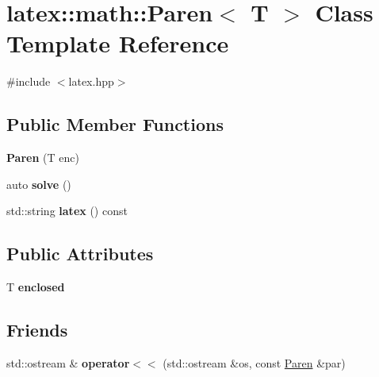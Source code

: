 \hypertarget{classlatex_1_1math_1_1Paren}{\section{latex\-:\-:math\-:\-:Paren$<$ T $>$ Class Template Reference}
\label{classlatex_1_1math_1_1Paren}
}


{\ttfamily \#include $<$latex.\-hpp$>$}

\subsection*{Public Member Functions}
\begin{DoxyCompactItemize}
\item 
\hypertarget{classlatex_1_1math_1_1Paren_a92ee4e0a519162e5c81ee889fdffb6ac}{{\bfseries Paren} (T enc)}\label{classlatex_1_1math_1_1Paren_a92ee4e0a519162e5c81ee889fdffb6ac}

\item 
\hypertarget{classlatex_1_1math_1_1Paren_aa64116c67d309121e19040fb3677da6a}{auto {\bfseries solve} ()}\label{classlatex_1_1math_1_1Paren_aa64116c67d309121e19040fb3677da6a}

\item 
\hypertarget{classlatex_1_1math_1_1Paren_a1f98ca0b80126f3df1ac5343788790ca}{std\-::string {\bfseries latex} () const }\label{classlatex_1_1math_1_1Paren_a1f98ca0b80126f3df1ac5343788790ca}

\end{DoxyCompactItemize}
\subsection*{Public Attributes}
\begin{DoxyCompactItemize}
\item 
\hypertarget{classlatex_1_1math_1_1Paren_a629cccc17db6e7e25e4d57ccabc5320a}{T {\bfseries enclosed}}\label{classlatex_1_1math_1_1Paren_a629cccc17db6e7e25e4d57ccabc5320a}

\end{DoxyCompactItemize}
\subsection*{Friends}
\begin{DoxyCompactItemize}
\item 
\hypertarget{classlatex_1_1math_1_1Paren_afcb1b94ae8023cf02d56f708ee5d25ea}{std\-::ostream \& {\bfseries operator$<$$<$} (std\-::ostream \&os, const \hyperlink{classlatex_1_1math_1_1Paren}{Paren} \&par)}\label{classlatex_1_1math_1_1Paren_afcb1b94ae8023cf02d56f708ee5d25ea}

\end{DoxyCompactItemize}


